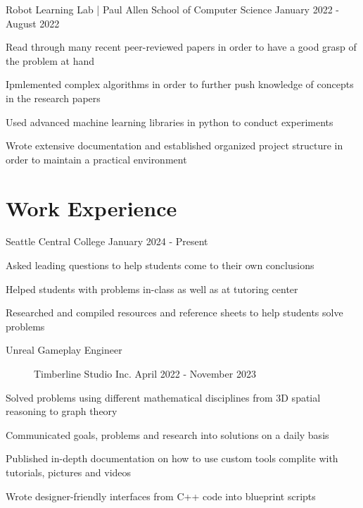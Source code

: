\documentclass[10pt]{article}
\newenvironment{itemize*}
{\begin{itemize}[leftmargin=*]
    \setlength{\parskip}{0.5pt}}
{\end{itemize}}
\begin{document}
\begin{description}[leftmargin=!,
                    labelwidth=\widthof{\bfseries Research Assistant}]

\item[Research Assistant] Robot Learning Lab | Paul Allen School of Computer
    Science \hfill 
    January 2022 - August 2022
\end{description}
\begin{itemize*}
\item Read through many recent peer-reviewed papers in order to have a good grasp of the problem at hand
\item Ipmlemented complex algorithms in order to further push knowledge of concepts in the research papers
\item Used advanced machine learning libraries in python to conduct experiments
\item Wrote extensive documentation and established organized project structure in order to maintain a practical environment
\end{itemize*}

\section*{Work Experience}
\begin{description}[leftmargin=!, labelwidth=\widthof{\bfseries Tutor}]
\item[Tutor] Seattle Central College \hfill 
    January 2024 - Present
\end{description}
\begin{itemize*}
\item Asked leading questions to help students come to their own conclusions
\item Helped students with problems in-class as well as at tutoring center
\item Researched and compiled resources and reference sheets to help students solve problems
\end{itemize*}
\vspace{10pt}

\begin{description}
\item[Unreal Gameplay Engineer] Timberline Studio Inc.
    \hfill April 2022 - November 2023
\end{description}
\begin{itemize*}
\item Solved problems using different mathematical disciplines from 3D spatial reasoning to graph theory
\item Communicated goals, problems and research into solutions on a daily basis
\item Published in-depth documentation on how to use custom tools complite with tutorials, pictures and videos
\item Wrote designer-friendly interfaces from C++ code into blueprint scripts
\end{itemize*}
\vspace{10pt}
\end{document}

